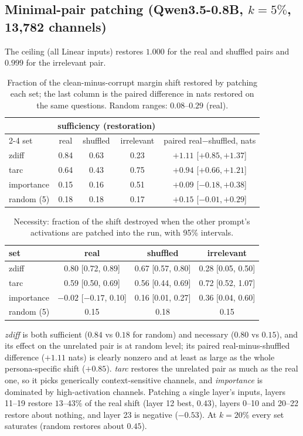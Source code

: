 \documentclass[11pt]{article}
\begin{document}
\subsection{Minimal-pair patching (Qwen3.5-0.8B, $k=5\%$, 13{,}782 channels)}
The ceiling (all Linear inputs) restores $1.000$ for the real and shuffled pairs and $0.999$ for the irrelevant pair.
\begin{table}[h]
\centering\small
\begin{tabular}{lcccc}
\toprule
 & \multicolumn{3}{c}{sufficiency (restoration)} & \\
\cmidrule(lr){2-4}
set & real & shuffled & irrelevant & paired real$-$shuffled, nats\\
\midrule
zdiff      & 0.84 & 0.63 & 0.23 & $+1.11$ [$+0.85,+1.37$]\\
tarc       & 0.64 & 0.43 & 0.75 & $+0.94$ [$+0.66,+1.21$]\\
importance & 0.15 & 0.16 & 0.51 & $+0.09$ [$-0.18,+0.38$]\\
random (5) & 0.18 & 0.18 & 0.17 & $+0.15$ [$-0.01,+0.29$]\\
\bottomrule
\end{tabular}
\caption{Fraction of the clean-minus-corrupt margin shift restored by patching each set; the last column is the paired difference in nats restored on the same questions. Random ranges: $0.08$--$0.29$ (real).}
\label{tab:patch}
\end{table}
\begin{table}[h]
\centering\small
\begin{tabular}{lccc}
\toprule
set & real & shuffled & irrelevant\\
\midrule
zdiff      & 0.80 [0.72, 0.89] & 0.67 [0.57, 0.80] & 0.28 [0.05, 0.50]\\
tarc       & 0.59 [0.50, 0.69] & 0.56 [0.44, 0.69] & 0.72 [0.52, 1.07]\\
importance & $-0.02$ [$-0.17$, 0.10] & 0.16 [0.01, 0.27] & 0.36 [0.04, 0.60]\\
random (5) & 0.15 & 0.18 & 0.15\\
\bottomrule
\end{tabular}
\caption{Necessity: fraction of the shift destroyed when the other prompt's activations are patched into the run, with 95\% intervals.}
\label{tab:necessity}
\end{table}
\emph{zdiff} is both sufficient ($0.84$ vs $0.18$ for random) and necessary ($0.80$ vs $0.15$), and its effect on the unrelated pair is at random level; its paired real-minus-shuffled difference ($+1.11$ nats) is clearly nonzero and at least as large as the whole persona-specific shift ($+0.85$).
\emph{tarc} restores the unrelated pair as much as the real one, so it picks generically context-sensitive channels, and \emph{importance} is dominated by high-activation channels.
Patching a single layer's inputs, layers 11--19 restore $13$--$43\%$ of the real shift (layer 12 best, $0.43$), layers 0--10 and 20--22 restore about nothing, and layer 23 is negative ($-0.53$). At $k=20\%$ every set saturates (random restores about $0.45$).
\end{document}
